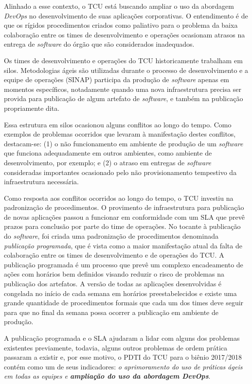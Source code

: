 Alinhado a esse contexto, o \acrfull{TCU} está buscando ampliar o uso da abordagem
\textit{DevOps} no desenvolvimento de suas aplicações corporativas. O
entendimento é de que os rígidos procedimentos criados como paliativo para o
problema da baixa colaboração entre os times de desenvolvimento e operações
ocasionam atrasos na entrega de \textit{software} do órgão que são considerados
inadequados.

Os times de desenvolvimento e operações do \acrshort{TCU} historicamente
trabalham em silos. Metodologias ágeis são utilizadas durante o processo de
desenvolvimento e a equipe de operações (\acrfull{SINAP}) participa da produção
de \textit{software} apenas em momentos específicos, notadamente quando uma nova
infraestrutura precisa ser provida para publicação de algum artefato de
\textit{software}, e também na publicação propriamente dita.

Essa estrutura em silos ocasionou alguns conflitos ao longo do tempo. Como
exemplos de problemas ocorridos que levaram à manifestação
destes conflitos, destacam-se: (1) o não funcionamento em ambiente de produção
de um \textit{software} que funciona adequadamente
em outros ambientes, como ambiente de desenvolvimento, por exemplo; e (2) o
atraso em entregas de \textit{software} consideradas importantes ocasionado
pelo não provisionamento tempestivo da infraestrutura necessária.

Como resposta aos conflitos ocorridos ao longo do tempo, o \acrshort{TCU}
investiu na padronização de procedimentos. O provimento de infraestrutura
para publicação de novas aplicações passou a funcionar em conformidade com um
\acrfull{SLA} que prevê prazos para conclusão por parte do time
de operações. No tocante à publicação do \textit{software}, foi criada uma padronização de
procedimentos denominada \emph{publicação programada}, que é vista como a maior
manifestação atual da falta de colaboração entre os times de desenvolvimento
e de operações do \acrshort{TCU}. A publicação programada
é um processo que prevê um complexo encadeamento de ações com horários bem
definidos visando reduzir o risco de problemas na publicação dos artefatos.
A versão de todas as aplicações desenvolvidas é congelada no início de cada
semana em horários preestabelecidos e existe uma grande quantidade de
procedimentos formais que cada um dos times deve seguir para que no final da
semana possa ocorrer a publicação em ambiente de produção.

A publicação programada e o SLA ajudaram a lidar com alguns dos problemas
existentes previamente, todavia, alguns outros problemas de ordem prática
passaram a existir e, por esse motivo, o \acrfull{PDTI} do \acrshort{TCU} para o
biênio 2017/2018 contém como um de seus indicadores: \emph{o aprimoramento do
uso de práticas ágeis em todas as equipes e \textbf{ampliação do uso da
abordagem DevOps}}.

